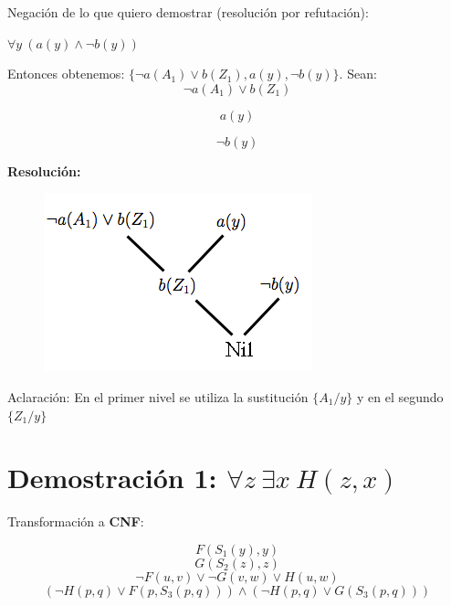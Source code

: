 \documentclass[12pt]{article} %
\begin{document}
\par Negación de lo que quiero demostrar (resolución por refutación):\\
 \par $\forall y \ (a(y) \wedge \neg b(y))$\\

\par Entonces obtenemos: $\{\neg a(A_1) \vee b(Z_1), a(y), \neg b(y)\}$. Sean: \\

\begin{equation}
\neg a(A_1) \vee b(Z_1)
\end{equation}

\begin{equation}
a(y)
\end{equation}

\begin{equation}
\neg b(y)
\end{equation}

\par \textbf{Resolución:}

\begin{figure}[H]
\begin{center}
\includegraphics[scale=0.60]{./images/arbolito.png}
\label{modelado}
\end{center}
\end{figure}

\par Aclaración: En el primer nivel se utiliza la sustitución $\{A_1/y\}$ y en el segundo $\{Z_1/y\}$

\section{Demostración 1: $\forall z \  \exists x \  H(z,x)$}

\par Transformación a \textbf{CNF}:

\begin{equation}
F(S_1(y), y)
\end{equation}
\begin{equation}
G(S_2(z),z)
\end{equation}
\begin{equation}
\neg F(u,v) \vee \neg G(v,w) \vee H(u,w)
\end{equation}
\begin{equation}
(\neg H(p,q) \vee F(p, S_3(p,q))) \wedge (\neg H(p,q) \vee G(S_3(p,q)))
\end{equation}
\end{document}
